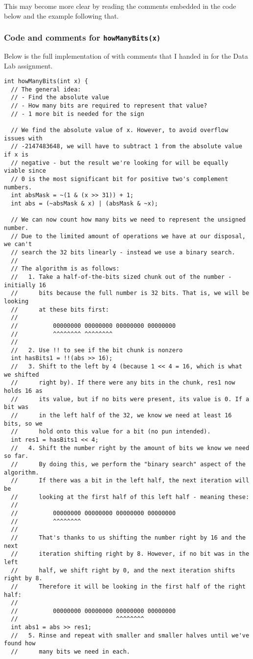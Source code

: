 This may become more clear by reading the comments embedded in the code below and the example following that.

\subsubsection{Code and comments for \texttt{howManyBits(x)}}

Below is the full implementation of  with comments that I handed in for the Data Lab assignment.

\bgroup
\small
\begin{verbatim}
int howManyBits(int x) {
  // The general idea:
  // - Find the absolute value
  // - How many bits are required to represent that value?
  // - 1 more bit is needed for the sign

  // We find the absolute value of x. However, to avoid overflow issues with
  // -2147483648, we will have to subtract 1 from the absolute value if x is
  // negative - but the result we're looking for will be equally viable since
  // 0 is the most significant bit for positive two's complement numbers.
  int absMask = ~(1 & (x >> 31)) + 1;
  int abs = (~absMask & x) | (absMask & ~x);

  // We can now count how many bits we need to represent the unsigned number.
  // Due to the limited amount of operations we have at our disposal, we can't
  // search the 32 bits linearly - instead we use a binary search.
  //
  // The algorithm is as follows:
  //   1. Take a half-of-the-bits sized chunk out of the number - initially 16
  //      bits because the full number is 32 bits. That is, we will be looking
  //      at these bits first:
  //
  //          00000000 00000000 00000000 00000000
  //          ^^^^^^^^ ^^^^^^^^
  //
  //   2. Use !! to see if the bit chunk is nonzero
  int hasBits1 = !!(abs >> 16);
  //   3. Shift to the left by 4 (because 1 << 4 = 16, which is what we shifted
  //      right by). If there were any bits in the chunk, res1 now holds 16 as
  //      its value, but if no bits were present, its value is 0. If a bit was
  //      in the left half of the 32, we know we need at least 16 bits, so we
  //      hold onto this value for a bit (no pun intended).
  int res1 = hasBits1 << 4;
  //   4. Shift the number right by the amount of bits we know we need so far.
  //      By doing this, we perform the "binary search" aspect of the algorithm.
  //      If there was a bit in the left half, the next iteration will be
  //      looking at the first half of this left half - meaning these:
  //
  //          00000000 00000000 00000000 00000000
  //          ^^^^^^^^
  //
  //      That's thanks to us shifting the number right by 16 and the next
  //      iteration shifting right by 8. However, if no bit was in the left
  //      half, we shift right by 0, and the next iteration shifts right by 8.
  //      Therefore it will be looking in the first half of the right half:
  //
  //          00000000 00000000 00000000 00000000
  //                            ^^^^^^^^
  int abs1 = abs >> res1;
  //   5. Rinse and repeat with smaller and smaller halves until we've found how
  //      many bits we need in each.


\end{verbatim}
